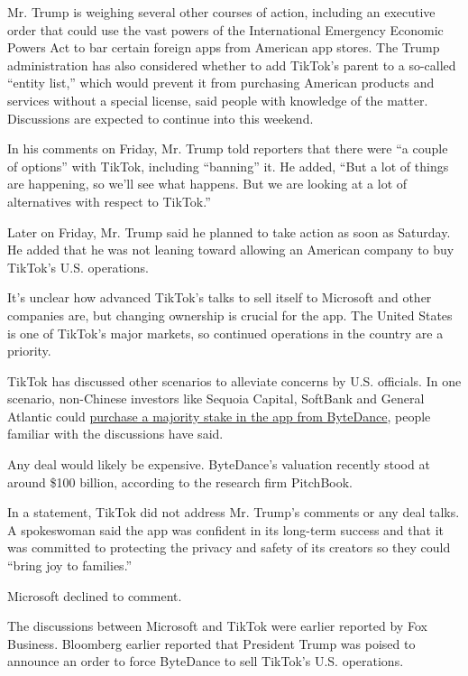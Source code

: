 Mr. Trump is weighing several other courses of action, including an
executive order that could use the vast powers of the International
Emergency Economic Powers Act to bar certain foreign apps from American
app stores. The Trump administration has also considered whether to add
TikTok's parent to a so-called ``entity list,'' which would prevent it
from purchasing American products and services without a special
license, said people with knowledge of the matter. Discussions are
expected to continue into this weekend.

In his comments on Friday, Mr. Trump told reporters that there were ``a
couple of options'' with TikTok, including ``banning'' it. He added,
``But a lot of things are happening, so we'll see what happens. But we
are looking at a lot of alternatives with respect to TikTok.''

Later on Friday, Mr. Trump said he planned to take action as soon as
Saturday. He added that he was not leaning toward allowing an American
company to buy TikTok's U.S. operations.

It's unclear how advanced TikTok's talks to sell itself to Microsoft and
other companies are, but changing ownership is crucial for the app. The
United States is one of TikTok's major markets, so continued operations
in the country are a priority.

TikTok has discussed other scenarios to alleviate concerns by U.S.
officials. In one scenario, non-Chinese investors like Sequoia Capital,
SoftBank and General Atlantic could
\href{https://www.nytimes3xbfgragh.onion/2020/07/23/business/dealbook/tiktok-bytedance-investors-trump.html}{purchase
a majority stake in the app from ByteDance}, people familiar with the
discussions have said.

Any deal would likely be expensive. ByteDance's valuation recently stood
at around \$100 billion, according to the research firm PitchBook.

In a statement, TikTok did not address Mr. Trump's comments or any deal
talks. A spokeswoman said the app was confident in its long-term success
and that it was committed to protecting the privacy and safety of its
creators so they could ``bring joy to families.''

Microsoft declined to comment.

The discussions between Microsoft and TikTok were earlier reported by
Fox Business. Bloomberg earlier reported that President Trump was poised
to announce an order to force ByteDance to sell TikTok's U.S.
operations.

